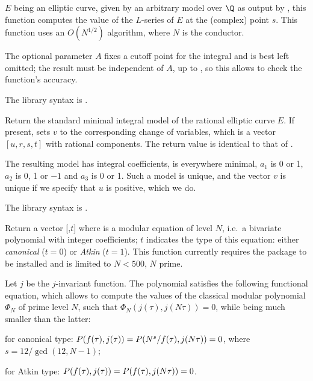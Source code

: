 \label{se:elllseries}
$E$ being an elliptic curve, given by an arbitrary model over $\Q$ as output
by , this function computes the value of the $L$-series of $E$ at
the (complex) point $s$. This function uses an $O(N^{1/2})$ algorithm, where
$N$ is the conductor.

The optional parameter $A$ fixes a cutoff point for the integral and is best
left omitted; the result must be independent of $A$, up to
, so this allows to check the function's accuracy.

The library syntax is .

\label{se:ellminimalmodel}
Return the standard minimal integral model of the rational elliptic
curve $E$. If present, sets $v$ to the corresponding change of variables,
which is a vector $[u,r,s,t]$ with rational components. The return value is
identical to that of .

The resulting model has integral coefficients, is everywhere minimal, $a_1$
is 0 or 1, $a_2$ is 0, 1 or $-1$ and $a_3$ is 0 or 1. Such a model is
unique, and the vector $v$ is unique if we specify that $u$ is positive,
which we do. 

The library syntax is .

\label{se:ellmodulareqn}
Return a vector [,$t$] where  is a modular equation of
level $N$, i.e.~a bivariate polynomial with integer coefficients; $t$
indicates the type of this equation: either \emph{canonical} ($t = 0$) or
\emph{Atkin} ($t = 1$). This function currently requires the package
 to be installed and is limited to $N<500$, $N$ prime.

Let $j$ be the $j$-invariant function. The polynomial  satisfies
the following functional equation, which allows to compute the values of the
classical modular polynomial $\Phi_N$ of prime level $N$, such that
$\Phi_N(j(\tau), j(N\tau)) = 0$, while being much smaller than the latter:

\item for canonical type:
 $P(f(\tau),j(\tau)) = P(N^s/f(\tau),j(N\*\tau)) = 0$,
 where $s = 12/\gcd(12,N-1)$;

\item for Atkin type:
 $P(f(\tau),j(\tau)) = P(f(\tau),j(N\*\tau)) = 0$.

